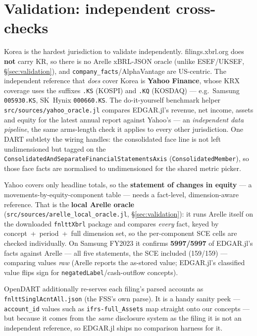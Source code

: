 \documentclass[11pt,a4paper]{report}
\begin{document}
\section{Validation: independent cross-checks}\label{sec:dart-oracle}

Korea is the hardest jurisdiction to validate independently. filings.xbrl.org does \textbf{not} carry KR,
so there is no Arelle xBRL-JSON oracle (unlike ESEF/UKSEF, \S\ref{sec:validation}), and
\texttt{company\_facts}/AlphaVantage are US-centric. The independent reference that \emph{does} cover Korea
is \textbf{Yahoo Finance}, whose KRX coverage uses the suffixes \texttt{.KS} (KOSPI) and \texttt{.KQ}
(KOSDAQ) --- e.g.\ Samsung \texttt{005930.KS}, SK~Hynix \texttt{000660.KS}. The do-it-yourself benchmark
helper \texttt{src/sources/yahoo\_oracle.jl} compares EDGAR.jl's revenue, net income, assets and equity for
the latest annual report against Yahoo's --- an \emph{independent data pipeline}, the same arms-length check it
applies to every other jurisdiction. One DART subtlety the wiring handles: the consolidated face line is
not left undimensioned but tagged on the \texttt{ConsolidatedAndSeparateFinancialStatementsAxis}
(\texttt{ConsolidatedMember}), so those face facts are normalised to undimensioned for the shared metric
picker.

Yahoo covers only headline totals, so the \textbf{statement of changes in equity} --- a movements-by-equity-component
table --- needs a fact-level, dimension-aware reference. That is the \textbf{local Arelle oracle}
(\texttt{src/sources/arelle\_local\_oracle.jl}, \S\ref{sec:validation}): it runs Arelle itself on the
downloaded \texttt{fnlttXbrl} package and compares \emph{every} fact, keyed by concept~+~period~+~full
dimension set, so the per-component SCE cells are checked individually. On Samsung FY2023 it confirms
\textbf{5997/5997} of EDGAR.jl's facts against Arelle --- all five statements, the SCE included
(159/159) --- comparing values \emph{raw} (Arelle reports the as-stored value; EDGAR.jl's classified value
flips sign for \texttt{negatedLabel}/cash-outflow concepts).

OpenDART additionally re-serves each filing's parsed accounts as \texttt{fnlttSinglAcntAll.json} (the FSS's
own parse). It is a handy sanity peek --- \texttt{account\_id} values such as \texttt{ifrs-full\_Assets} map
straight onto our concepts --- but because it comes from the \emph{same} disclosure system as the filing it
is not an independent reference, so EDGAR.jl ships no comparison harness for it.
\end{document}

